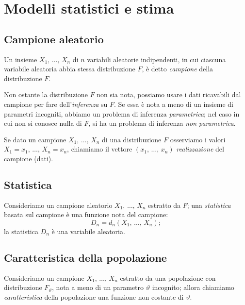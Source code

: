 
\chapter{Modelli statistici e stima}
    \section{Campione aleatorio}
        \begin{defn}
            Un insieme $X_1,\, \ldots,\, X_{n}$ di $n$ variabili aleatorie indipendenti, in cui ciascuna 
            variabile aleatoria abbia stessa distribuzione $F$, è detto \emph{campione} della 
            distribuzione $F$.

            Non ostante la distribuzione $F$ non sia nota, possiamo usare i dati ricavabili dal campione
            per fare dell'\emph{inferenza} su $F$. Se essa è nota a meno di un insieme di parametri 
            incogniti, abbiamo un problema di inferenza \emph{parametrica}; nel caso in cui non si conosce 
            nulla di $F$, si ha un problema di inferenza \emph{non parametrica}.
        \end{defn}
        \begin{defn}[Realizzazione]
            Se dato un campione $X_1,\, \ldots,\, X_{n}$ di una distribuzione $F$ osserviamo i valori 
            $X_1=x_1,\, \ldots,\, X_{n}=x_n$, chiamiamo il vettore $(x_1,\, \ldots,\, x_n)$ 
            \emph{realizzazione} del campione (dati).
        \end{defn}
    \section{Statistica}
        \begin{defn}
            Consideriamo un campione aleatorio $X_1,\, \ldots,\, X_{n}$ estratto da $F$; una 
            \emph{statistica} basata sul campione è una funzione nota del campione: \[
                D_n = d_n(X_1,\, \ldots,\, X_{n})
            ;\] la statistica $D_n$ è una variabile aleatoria.
        \end{defn}
    \section{Caratteristica della popolazione}
        \begin{defn}
            Consideriamo un campione $X_1,\, \ldots,\, X_{n}$ estratto da una popolazione con 
            distribuzione $F_\vartheta$, nota a meno di un parametro $\vartheta$ incognito; allora 
            chiamiamo \emph{caratteristica} della popolazione una funzione non costante di $\vartheta$.
        \end{defn}
